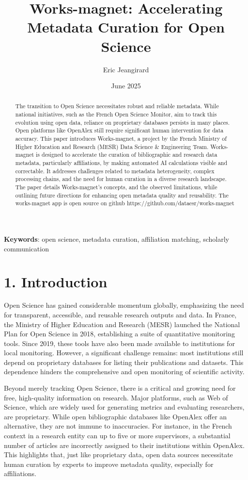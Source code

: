 \documentclass[
]{article}
\title{Works-magnet: Accelerating Metadata Curation for Open Science}
\author[%
  1%
  ]{%
  Eric Jeangirard%
}
\affil[1]{French Ministry of Higher Education and Research, Paris,
France}
\date{June 2025}
\begin{document}
\maketitle
\begin{abstract}
The transition to Open Science necessitates robust and reliable
metadata. While national initiatives, such as the French Open Science
Monitor, aim to track this evolution using open data, reliance on
proprietary databases persists in many places. Open platforms like
OpenAlex still require significant human intervention for data accuracy.
This paper introduces Works-magnet, a project by the French Ministry of
Higher Education and Research (MESR) Data Science \& Engineering Team.
Works-magnet is designed to accelerate the curation of bibliographic and
research data metadata, particularly affiliations, by making automated
AI calculations visible and correctable. It addresses challenges related
to metadata heterogeneity, complex processing chains, and the need for
human curation in a diverse research landscape. The paper details
Works-magnet's concepts, and the observed limitations, while outlining
future directions for enhancing open metadata quality and reusability.
The works-magnet app is open source on github
https://github.com/dataesr/works-magnet
\end{abstract}

\textbf{Keywords}: open science, metadata curation, affiliation
matching, scholarly communication

\hypertarget{introduction}{%
\section{1. Introduction}\label{introduction}}

Open Science has gained considerable momentum globally, emphasizing the
need for transparent, accessible, and reusable research outputs and
data. In France, the Ministry of Higher Education and Research (MESR)
launched the National Plan for Open Science in 2018, establishing a
suite of quantitative monitoring tools. Since 2019, these tools have
also been made available to institutions for local monitoring. However,
a significant challenge remains: most institutions still depend on
proprietary databases for listing their publications and datasets. This
dependence hinders the comprehensive and open monitoring of scientific
activity.

Beyond merely tracking Open Science, there is a critical and growing
need for free, high-quality information on research. Major platforms,
such as Web of Science, which are widely used for generating metrics and
evaluating researchers, are proprietary. While open bibliographic
databases like OpenAlex offer an alternative, they are not immune to
inaccuracies. For instance, in the French context in a research entity
can up to five or more supervisors, a substantial number of articles are
incorrectly assigned to their institutions within OpenAlex. This
highlights that, just like proprietary data, open data sources
necessitate human curation by experts to improve metadata quality,
especially for affiliations.
\end{document}
